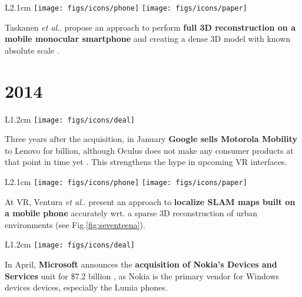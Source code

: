 \documentclass[12pt,a4paper]{article}
\makeatletter
\DeclareRobustCommand\onedot{\futurelet\@let@token\@onedot}
\def\@onedot{\ifx\@let@token.\else.\null\fi\xspace}
\def\etal{\emph{et al}\onedot}
\makeatother
\begin{document}
\vspace{0.1in}

\begin{wrapfigure}{L}{2.1cm}
	\vspace{-15pt}	
	\texttt{[image: figs/icons/phone]}
	\texttt{[image: figs/icons/paper]}
	\vspace{-25pt}		
\end{wrapfigure} 
\noindent Taskanen \etal propose an approach to perform \textbf{full 3D reconstruction on a mobile monocular smartphone} and creating a dense 3D model with known absolute scale \cite{Taskanen13}.

\vspace{-5pt}
\section*{2014}

\begin{wrapfigure}{L}{1.2cm}
	\vspace{-10pt}	
	\texttt{[image: figs/icons/deal]}
	\vspace{-20pt}		
\end{wrapfigure} 
Three years after the acquisition, in January \textbf{Google sells Motorola Mobility} to Lenovo for \2 billion, although Oculus does not make any consumer products at that point in time yet . This strengthens the hype in upcoming VR interfaces.

\vspace{0.1in}

\begin{wrapfigure}{L}{2.1cm}
	\vspace{-15pt}	
	\texttt{[image: figs/icons/phone]}
	\texttt{[image: figs/icons/paper]}
	\vspace{-25pt}		
\end{wrapfigure} 
\noindent At VR, Ventura \etal present an approach to \textbf{localize SLAM maps built on a mobile phone} accurately wrt. a sparse 3D reconstruction of urban environments \cite{Ventura14} (see Fig.\ref{fig:seventeena}).

\vspace{0.1in}

\begin{wrapfigure}{L}{1.2cm}
	\vspace{-0pt}	
	\texttt{[image: figs/icons/deal]}
	\vspace{-20pt}		
\end{wrapfigure} 
\noindent In April, \textbf{Microsoft} announces the \textbf{acquisition of Nokia's Devices and Services} unit for \$7.2 billion , as Nokia is the primary vendor for Windows devices devices, especially the Lumia phones.
\end{document}
